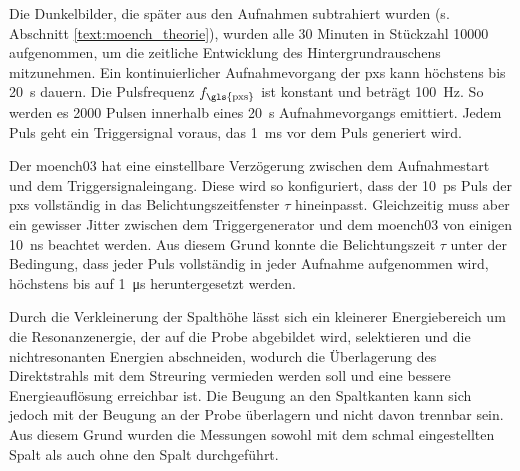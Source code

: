 \noindent
Die Dunkelbilder, die später aus den Aufnahmen subtrahiert wurden (s. Abschnitt \ref{text:moench_theorie}), wurden alle 30 Minuten in Stückzahl \num{10000} aufgenommen, um die zeitliche Entwicklung des Hintergrundrauschens mitzunehmen. Ein kontinuierlicher Aufnahmevorgang der \gls{pxs} kann höchstens bis \SI{20}{\second} dauern. Die Pulsfrequenz $f_\text{\gls{pxs}}$ ist konstant und beträgt \SI{100}{\hertz}. So werden es \num{2000} Pulsen innerhalb eines \SI{20}{\second} Aufnahmevorgangs emittiert. Jedem Puls geht ein Triggersignal voraus, das \SI{1}{\milli\second} vor dem Puls generiert wird.

\noindent
Der \gls{moench03} hat eine einstellbare Verzögerung zwischen dem Aufnahmestart und dem Triggersignaleingang. Diese wird so konfiguriert, dass der \SI{10}{\pico\second} Puls der \gls{pxs} vollständig in das Belichtungszeitfenster $\tau$ hineinpasst. Gleichzeitig muss aber ein gewisser Jitter zwischen dem Triggergenerator und dem \gls{moench03} von einigen \SI{10}{\nano\second} beachtet werden. Aus diesem Grund konnte die Belichtungszeit $\tau$ unter der Bedingung, dass jeder Puls vollständig in jeder Aufnahme aufgenommen wird, höchstens bis auf \SI{1}{\micro\second} heruntergesetzt werden.

\noindent
Durch die Verkleinerung der Spalthöhe lässt sich ein kleinerer Energiebereich um die Resonanzenergie, der auf die Probe abgebildet wird, selektieren und die nichtresonanten Energien abschneiden, wodurch die Überlagerung des Direktstrahls mit dem Streuring vermieden werden soll und eine bessere Energieauflösung erreichbar ist. Die Beugung an den Spaltkanten kann sich jedoch mit der Beugung an der Probe überlagern und nicht davon trennbar sein. Aus diesem Grund wurden die Messungen sowohl mit dem schmal eingestellten Spalt als auch ohne den Spalt durchgeführt.


